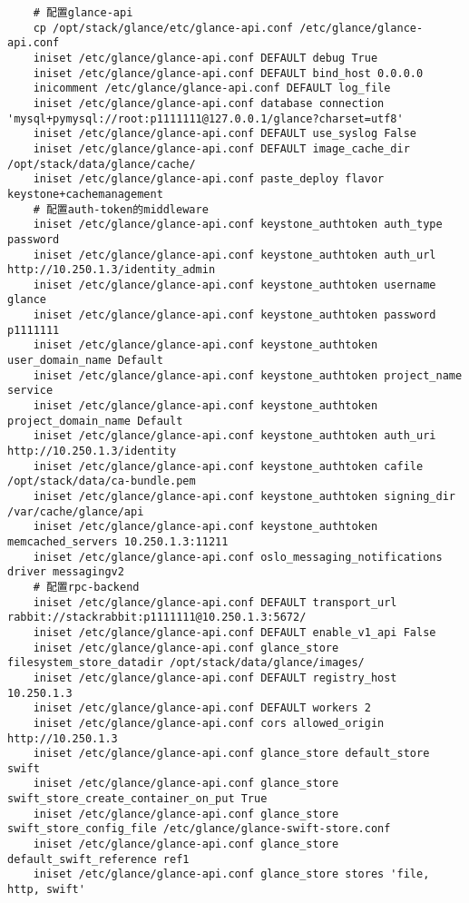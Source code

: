 \documentclass[a4paper,left=1.5cm,right=1.5cm,11pt]{article}
\begin{document}
\begin{lstlisting}
	# 配置glance-api
    cp /opt/stack/glance/etc/glance-api.conf /etc/glance/glance-api.conf
    iniset /etc/glance/glance-api.conf DEFAULT debug True
    iniset /etc/glance/glance-api.conf DEFAULT bind_host 0.0.0.0
    inicomment /etc/glance/glance-api.conf DEFAULT log_file
    iniset /etc/glance/glance-api.conf database connection 'mysql+pymysql://root:p1111111@127.0.0.1/glance?charset=utf8'
    iniset /etc/glance/glance-api.conf DEFAULT use_syslog False
    iniset /etc/glance/glance-api.conf DEFAULT image_cache_dir /opt/stack/data/glance/cache/
    iniset /etc/glance/glance-api.conf paste_deploy flavor keystone+cachemanagement
	# 配置auth-token的middleware
	iniset /etc/glance/glance-api.conf keystone_authtoken auth_type password
    iniset /etc/glance/glance-api.conf keystone_authtoken auth_url http://10.250.1.3/identity_admin
    iniset /etc/glance/glance-api.conf keystone_authtoken username glance
    iniset /etc/glance/glance-api.conf keystone_authtoken password p1111111
    iniset /etc/glance/glance-api.conf keystone_authtoken user_domain_name Default
    iniset /etc/glance/glance-api.conf keystone_authtoken project_name service
    iniset /etc/glance/glance-api.conf keystone_authtoken project_domain_name Default
    iniset /etc/glance/glance-api.conf keystone_authtoken auth_uri http://10.250.1.3/identity
    iniset /etc/glance/glance-api.conf keystone_authtoken cafile /opt/stack/data/ca-bundle.pem
    iniset /etc/glance/glance-api.conf keystone_authtoken signing_dir /var/cache/glance/api
    iniset /etc/glance/glance-api.conf keystone_authtoken memcached_servers 10.250.1.3:11211
    iniset /etc/glance/glance-api.conf oslo_messaging_notifications driver messagingv2
	# 配置rpc-backend
	iniset /etc/glance/glance-api.conf DEFAULT transport_url rabbit://stackrabbit:p1111111@10.250.1.3:5672/
	iniset /etc/glance/glance-api.conf DEFAULT enable_v1_api False
    iniset /etc/glance/glance-api.conf glance_store filesystem_store_datadir /opt/stack/data/glance/images/
    iniset /etc/glance/glance-api.conf DEFAULT registry_host 10.250.1.3
    iniset /etc/glance/glance-api.conf DEFAULT workers 2
	iniset /etc/glance/glance-api.conf cors allowed_origin http://10.250.1.3
	iniset /etc/glance/glance-api.conf glance_store default_store swift
    iniset /etc/glance/glance-api.conf glance_store swift_store_create_container_on_put True
	iniset /etc/glance/glance-api.conf glance_store swift_store_config_file /etc/glance/glance-swift-store.conf
    iniset /etc/glance/glance-api.conf glance_store default_swift_reference ref1
    iniset /etc/glance/glance-api.conf glance_store stores 'file, http, swift'

\end{lstlisting}
\end{document}

